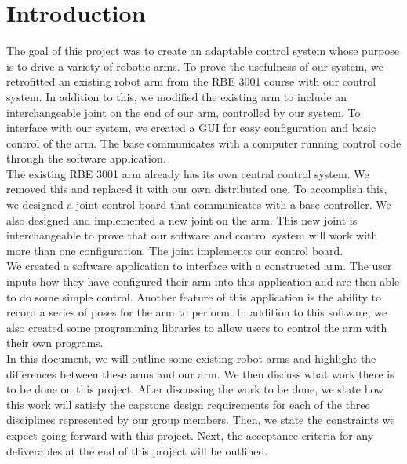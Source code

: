 \section{Introduction} 

The goal of this project was to create an adaptable control system whose purpose is to drive a variety of robotic arms. To prove the usefulness of our system, we retrofitted an existing robot arm from the RBE 3001 course with our control system.  In addition to this, we modified the existing arm to include an interchangeable joint on the end of our arm, controlled by our system. To interface with our system, we created a GUI for easy configuration and basic control of the arm. The base communicates with a computer running control code through the software application. \\
\newline
The existing RBE 3001 arm already has its own central control system. We removed this and replaced it with our own distributed one. To accomplish this, we designed a joint control board that communicates with a base controller.  We also designed and implemented a new joint on the arm. This new joint is interchangeable to prove that our software and control system will work with more than one configuration. The joint implements our control board. \\
\newline
We created a software application to interface with a constructed arm. The user inputs how they have configured their arm into this application and are then able to do some simple control. Another feature of this application is the ability to record a series of poses for the arm to perform. In addition to this software, we also created some programming libraries to allow users to control the arm with their own programs. \\
\newline
In this document, we will outline some existing robot arms and highlight the differences between these arms and our arm. We then discuss what work there is to be done on this project. After discussing the work to be done, we state how this work will satisfy the capstone design requirements for each of the three disciplines represented by our group members. Then, we state the constraints we expect going forward with this project. Next, the acceptance criteria for any deliverables at the end of this project will be outlined. 